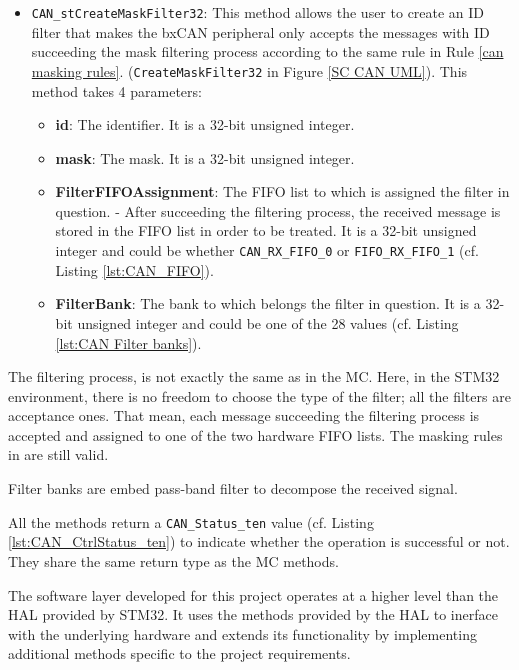 \begin{itemize}
    \item \verb|CAN_stCreateMaskFilter32|: This method allows the user to create an ID filter that makes the bxCAN peripheral only accepts the messages with ID succeeding the mask filtering process according to the same rule in Rule \ref{can masking rules}. (\texttt{CreateMaskFilter32} in Figure \ref{SC CAN UML}). This method takes 4 parameters:
    \begin{itemize}
        \item \textbf{id}: The identifier. It is a 32-bit unsigned integer.
        \item \textbf{mask}: The mask. It is a 32-bit unsigned integer.
        \item \textbf{FilterFIFOAssignment}: The FIFO list to which is assigned the filter in question. - After succeeding the filtering process, the received message is stored in the FIFO list in order to be treated. It is a 32-bit unsigned integer and could be whether \texttt{CAN\_RX\_FIFO\_0} or \texttt{FIFO\_RX\_FIFO\_1} (cf. Listing \ref{lst:CAN_FIFO}).
        \item \textbf{FilterBank}: The bank to which belongs the filter in question. It is a 32-bit unsigned integer and could be one of the 28 values (cf. Listing \ref{lst:CAN Filter banks}).
    \end{itemize}

\end{itemize}

The filtering process, is not exactly the same as in the MC. Here, in the STM32 environment, there is no freedom to choose the type of the filter; all the filters are acceptance ones. That mean, each message succeeding the filtering process is accepted and assigned to one of the two hardware FIFO lists. The masking rules in \label{lst:CAN masking rules} are still valid.

Filter banks are embed pass-band filter to decompose the received signal.

All the methods return a \texttt{CAN\_Status\_ten} value (cf. Listing \ref{lst:CAN_CtrlStatus_ten}) to indicate whether the operation is successful or not. They share the same return type as the MC methods.

The software layer developed for this project operates at a higher level than the HAL provided by STM32. It uses the methods provided by the HAL to inerface with the underlying hardware and extends its functionality by implementing additional methods specific to the project requirements.

